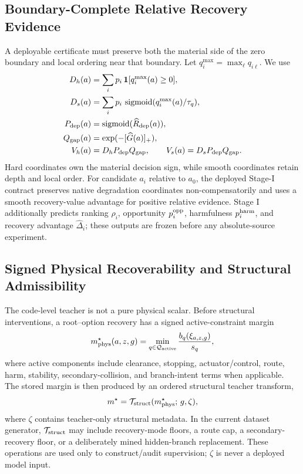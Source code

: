 \documentclass[conference]{IEEEtran}
\DeclareMathOperator{\sigmoid}{sigmoid}
\begin{document}
\subsection{Boundary-Complete Relative Recovery Evidence}
\label{subsec:bc_relative}
A deployable certificate must preserve both the material side of the zero boundary and local ordering near that boundary. Let $q_i^{\max}=\max_\ell q_{i\ell}$. We use
\begin{align}
 D_h(a)&=\sum_i p_i\,\mathbf{1}[q_i^{\max}(a)\ge0],\\
 D_s(a)&=\sum_i p_i\,\sigmoid(q_i^{\max}(a)/\tau_q),\\
 P_{\rm dep}(a)&=\sigmoid(\widehat R_{\rm dep}(a)),\\
 Q_{\rm gap}(a)&=\exp(-[\widehat G(a)]_+),\\
 V_h(a)&=D_hP_{\rm dep}Q_{\rm gap},\qquad V_s(a)=D_sP_{\rm dep}Q_{\rm gap}.
 \label{eq:native_recovery_values}
\end{align}
Hard coordinates own the material decision sign, while smooth coordinates retain depth and local order. For candidate $a_i$ relative to $a_0$, the deployed Stage-I contract preserves native degradation coordinates non-compensatorily and uses a smooth recovery-value advantage for positive relative evidence. Stage I additionally predicts ranking $\rho_i$, opportunity $p_i^{\rm opp}$, harmfulness $p_i^{\rm harm}$, and recovery advantage $\widehat\Delta_i$; these outputs are frozen before any absolute-source experiment.

\subsection{Signed Physical Recoverability and Structural Admissibility}
\label{subsec:truth_semantics}
The code-level teacher is not a pure physical scalar. Before structural interventions, a root--option recovery has a signed active-constraint margin
\begin{equation}
 m^{\star}_{\rm phys}(a,z,g)=\min_{q\in\mathcal{Q}_{\rm active}}\frac{b_q(\xi_{a,z,g})}{s_q},
 \label{eq:physical_margin}
\end{equation}
where active components include clearance, stopping, actuator/control, route, harm, stability, secondary-collision, and branch-intent terms when applicable. The stored margin is then produced by an ordered structural teacher transform,
\begin{equation}
 m^{\star}=\mathcal{T}_{\rm struct}(m^{\star}_{\rm phys};\,g,\zeta),
 \label{eq:structural_teacher}
\end{equation}
where $\zeta$ contains teacher-only structural metadata. In the current dataset generator, $\mathcal{T}_{\rm struct}$ may include recovery-mode floors, a route cap, a secondary-recovery floor, or a deliberately mined hidden-branch replacement. These operations are used only to construct/audit supervision; $\zeta$ is never a deployed model input.
\end{document}
